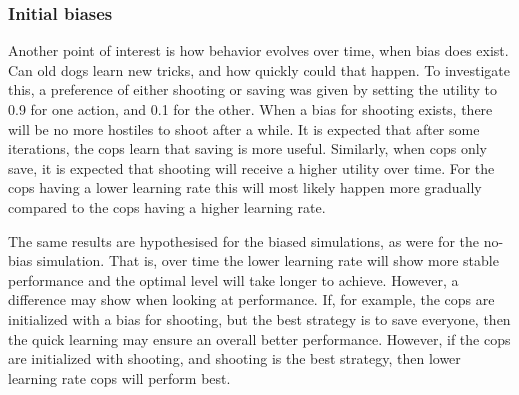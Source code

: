 \subsubsection{Initial biases}
Another point of interest is how behavior evolves over time, when bias does exist. Can old dogs learn new tricks, and how quickly could that happen. To investigate this, a preference of either shooting or saving was given by setting the utility to 0.9 for one action, and 0.1 for the other. When a bias for shooting exists, there will be no more hostiles to shoot after a while. It is expected that after some iterations, the cops learn that saving is more useful. Similarly, when cops only save, it is expected that shooting will receive a higher utility over time. For the cops having a lower learning rate this will most likely happen more gradually compared to the cops having a higher learning rate.

The same results are hypothesised for the biased simulations, as were for the no-bias simulation. That is, over time the lower learning rate will show more stable performance and the optimal level will take longer to achieve. However, a difference may show when looking at performance. If, for example, the cops are initialized with a bias for shooting, but the best strategy is to save everyone, then the quick learning may ensure an overall better performance. However, if the cops are initialized with shooting, and shooting is the best strategy, then lower learning rate cops will perform best. 